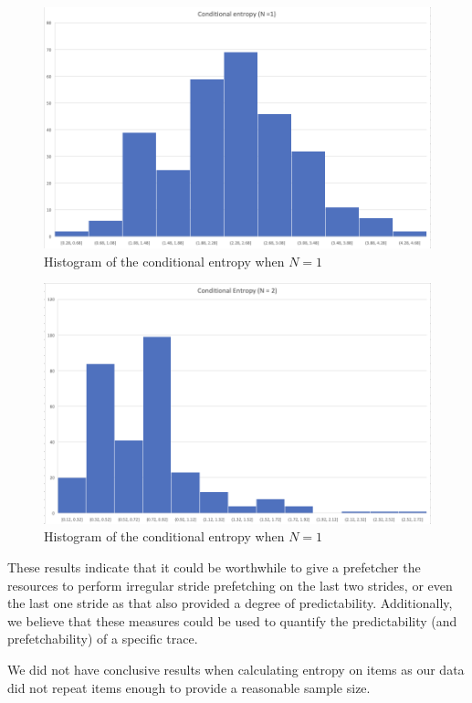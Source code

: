 \begin{figure}[ht]
    \centering
    \includegraphics[scale=0.7]{conditional 1.png}
    \caption{Histogram of the conditional entropy when $N = 1$}
    \label{fig:cond1}
\end{figure}

\begin{figure}[ht]
    \centering
    \includegraphics[scale=0.7]{conditional 2.png}
    \caption{Histogram of the conditional entropy when $N = 1$}
    \label{fig:cond2}
\end{figure}

These results indicate that it could be worthwhile to give a prefetcher the resources to perform irregular stride prefetching on the last two strides, or even the last one stride as that also provided a degree of predictability.  Additionally, we believe that these measures could be used to quantify the predictability (and prefetchability) of a specific trace.

We did not have conclusive results when calculating entropy on items as our data did not repeat items enough to provide a reasonable sample size.

